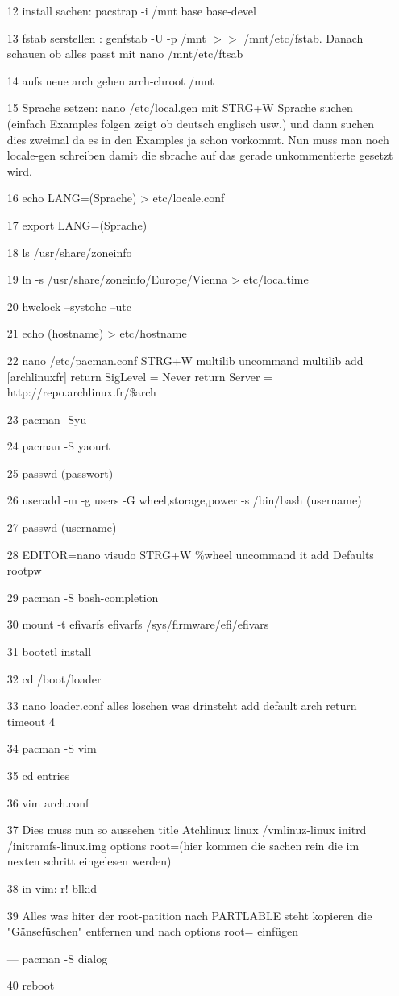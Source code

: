 \documentclass[a4paper,12pt]{article}
\begin{document}
\begin{itemize}
	\item[12] install sachen: pacstrap -i /mnt base base-devel
	\item[13] fstab serstellen : genfstab -U -p /mnt $>>$ /mnt/etc/fstab. Danach schauen ob alles passt mit nano /mnt/etc/ftsab
	\item[14] aufs neue arch gehen arch-chroot /mnt
	\item[15] Sprache setzen: nano /etc/local.gen mit STRG+W Sprache suchen (einfach Examples folgen zeigt ob deutsch englisch usw.) und dann suchen dies zweimal da es in den Examples ja schon vorkommt. Nun muss man noch locale-gen schreiben damit die sbrache auf das gerade unkommentierte gesetzt wird.
	\item[16] echo LANG=(Sprache) > etc/locale.conf
	\item[17] export LANG=(Sprache) 
	\item[18] ls /usr/share/zoneinfo
	\item[19] ln -s /usr/share/zoneinfo/Europe/Vienna > etc/localtime
	\item[20] hwclock --systohc --utc
	\item[21] echo (hostname) > etc/hostname
	\item[22] nano /etc/pacman.conf        STRG+W multilib      uncommand multilib       add [archlinuxfr] return SigLevel = Never return Server = http://repo.archlinux.fr/\$arch
	\item[23] pacman -Syu
	\item[24] pacman -S yaourt
	\item[25] passwd (passwort)
	\item[26] useradd -m -g users -G wheel,storage,power -s /bin/bash (username)
	\item[27] passwd	(username)
	\item[28] EDITOR=nano visudo       STRG+W \%wheel     uncommand it       add       Defaults rootpw
	\item[29] pacman -S bash-completion
	\item[30] mount -t efivarfs efivarfs /sys/firmware/efi/efivars
	\item[31] bootctl install
	\item[32] cd /boot/loader
	\item[33] nano loader.conf       alles löschen was drinsteht       add   default arch return timeout 4
	\item[34] pacman -S vim
	\item[35] cd entries
	\item[36] vim arch.conf
	\item[37] Dies muss nun so aussehen
		\subitem title Atchlinux
		\subitem linux /vmlinuz-linux
		\subitem initrd /initramfs-linux.img
		\subitem options root=(hier kommen die sachen rein die im nexten schritt eingelesen werden)
	\item[38] in vim:    r! blkid
	\item[39] Alles was hiter der root-patition nach PARTLABLE steht kopieren die "Gänsefüschen" entfernen und nach options root=   einfügen
	\item[---] pacman -S dialog
	\item[40] reboot 
\end{itemize}
	
\end{document}
